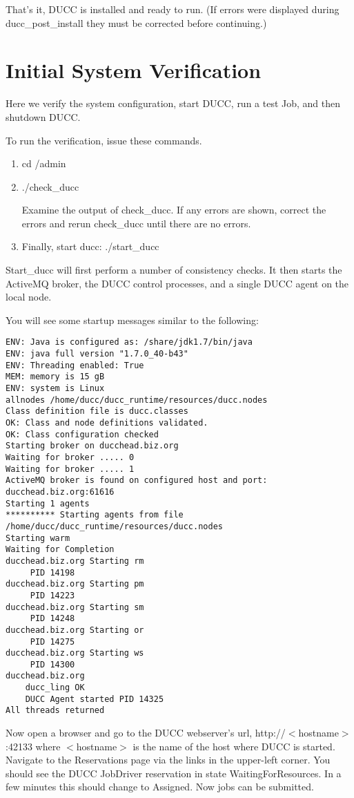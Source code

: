 That's it, DUCC is installed and ready to run. (If errors were displayed during ducc\_post\_install
they must be corrected before continuing.)

\section{Initial System Verification}

Here we verify the system configuration, start DUCC, run a test Job, and then shutdown DUCC.

To run the verification, issue these commands.
\begin{enumerate}
  \item cd \duccruntime/admin 
  \item ./check\_ducc
  
    Examine the output of check\_ducc.  If any errors are shown, correct the errors and rerun
    check\_ducc until there are no errors.  
  \item Finally, start ducc: ./start\_ducc
  \end{enumerate}
  
  Start\_ducc will first perform a number of consistency checks.
  It then starts the ActiveMQ broker, the DUCC control processes, and a single DUCC agent on the
  local node.

  You will see some startup messages similar to the following:

\begin{verbatim}
ENV: Java is configured as: /share/jdk1.7/bin/java
ENV: java full version "1.7.0_40-b43"
ENV: Threading enabled: True
MEM: memory is 15 gB
ENV: system is Linux
allnodes /home/ducc/ducc_runtime/resources/ducc.nodes
Class definition file is ducc.classes
OK: Class and node definitions validated.
OK: Class configuration checked
Starting broker on ducchead.biz.org
Waiting for broker ..... 0
Waiting for broker ..... 1
ActiveMQ broker is found on configured host and port: ducchead.biz.org:61616
Starting 1 agents
********** Starting agents from file /home/ducc/ducc_runtime/resources/ducc.nodes
Starting warm
Waiting for Completion
ducchead.biz.org Starting rm
     PID 14198
ducchead.biz.org Starting pm
     PID 14223
ducchead.biz.org Starting sm
     PID 14248
ducchead.biz.org Starting or
     PID 14275
ducchead.biz.org Starting ws
     PID 14300
ducchead.biz.org
    ducc_ling OK
    DUCC Agent started PID 14325
All threads returned
\end{verbatim}

  Now open a browser and go to the DUCC webserver's url, http://$<$hostname$>$:42133 where $<$hostname$>$ is
  the name of the host where DUCC is started.  Navigate to the Reservations page via the links in
  the upper-left corner.  You should see the DUCC JobDriver reservation in state
  WaitingForResources.  In a few minutes this should change to Assigned.
  Now jobs can be submitted.
  
